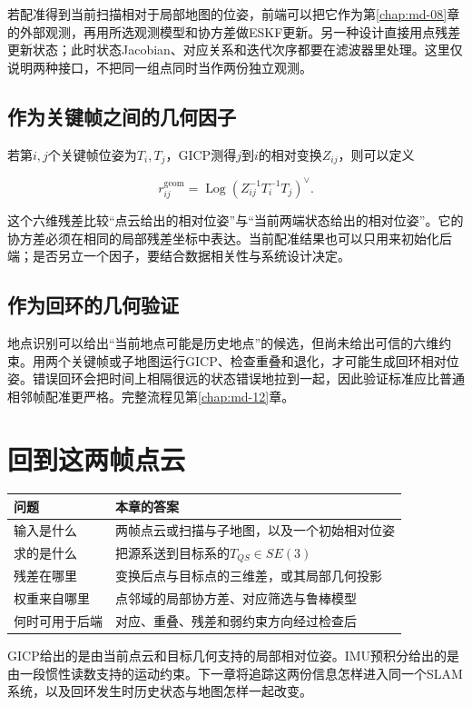 若配准得到当前扫描相对于局部地图的位姿，前端可以把它作为第\ref{chap:md-08}章的外部观测，再用所选观测模型和协方差做ESKF更新。另一种设计直接用点残差更新状态；此时状态Jacobian、对应关系和迭代次序都要在滤波器里处理。这里仅说明两种接口，不把同一组点同时当作两份独立观测。

\subsection{作为关键帧之间的几何因子}

若第$i,j$个关键帧位姿为$T_i,T_j$，GICP测得$j$到$i$的相对变换$Z_{ij}$，则可以定义

\begin{equation*}
r_{ij}^{\mathrm{geom}}
=\operatorname{Log}\!\left(Z_{ij}^{-1}T_i^{-1}T_j\right)^\vee.
\end{equation*}

这个六维残差比较“点云给出的相对位姿”与“当前两端状态给出的相对位姿”。它的协方差必须在相同的局部残差坐标中表达。当前配准结果也可以只用来初始化后端；是否另立一个因子，要结合数据相关性与系统设计决定。

\subsection{作为回环的几何验证}

地点识别可以给出“当前地点可能是历史地点”的候选，但尚未给出可信的六维约束。用两个关键帧或子地图运行GICP、检查重叠和退化，才可能生成回环相对位姿。错误回环会把时间上相隔很远的状态错误地拉到一起，因此验证标准应比普通相邻帧配准更严格。完整流程见第\ref{chap:md-12}章。

\section{回到这两帧点云}

\begin{center}\small\begin{tabular}{p{}p{}}\toprule

问题 & 本章的答案 \\

\midrule

输入是什么 & 两帧点云或扫描与子地图，以及一个初始相对位姿 \\

求的是什么 & 把源系送到目标系的$T_{QS}\in SE(3)$ \\

残差在哪里 & 变换后点与目标点的三维差，或其局部几何投影 \\

权重来自哪里 & 点邻域的局部协方差、对应筛选与鲁棒模型 \\

何时可用于后端 & 对应、重叠、残差和弱约束方向经过检查后 \\

\bottomrule\end{tabular}\end{center}

GICP给出的是由当前点云和目标几何支持的局部相对位姿。IMU预积分给出的是由一段惯性读数支持的运动约束。下一章将追踪这两份信息怎样进入同一个SLAM系统，以及回环发生时历史状态与地图怎样一起改变。
